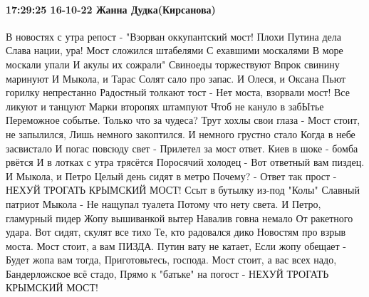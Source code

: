  
 
 
 
 

\paragraph{17:29:25 16-10-22 Жанна Дудка(Кирсанова)}

В новостях с утра репост -
"Взорван оккупантский мост!
Плохи Путина дела
Слава нации, ура!
Мост сложился штабелями
С ехавшими москалями
В море москали упали
И акулы их сожрали"
Свиноеды торжествуют
Впрок свинину маринуют
И Мыкола, и Тарас
Солят сало про запас.
И Олеся, и Оксана
Пьют горилку непрестанно
Радостный толкают тост -
Нет моста, взорвали мост!
Все ликуют и танцуют
Марки второпях штампуют
Чтоб не кануло в забЫтье
Переможное событье.
Только что за чудеса?
Трут хохлы свои глаза -
Мост стоит, не запылился,
Лишь немного закоптился.
И немного грустно стало
Когда в небе засвистало
И погас повсюду свет -
Прилетел за мост ответ.
Киев в шоке - бомба рвётся
И в лотках с утра трясётся
Поросячий холодец -
Вот ответный вам пиздец.
И Мыкола, и Петро
Целый день сидят в метро
Почему? - Ответ так прост -
НЕХУЙ ТРОГАТЬ КРЫМСКИЙ МОСТ!
Ссыт в бутылку из-под "Колы"
Славный патриот Мыкола -
Не нащупал туалета
Потому что нету света.
И Петро, гламурный пидер
Жопу вышиванкой вытер
Навалив говна немало
От ракетного удара.
Вот сидят, скулят все тихо
Те, кто радовался дико
Новостям про взрыв моста.
Мост стоит, а вам ПИЗДА.
Путин вату не катает,
Если жопу обещает -
Будет жопа вам тогда,
Приготовьтесь, господа.
Мост стоит, а вас всех надо,
Бандерложское всё стадо,
Прямо к "батьке" на погост -
НЕХУЙ ТРОГАТЬ КРЫМСКИЙ МОСТ!
